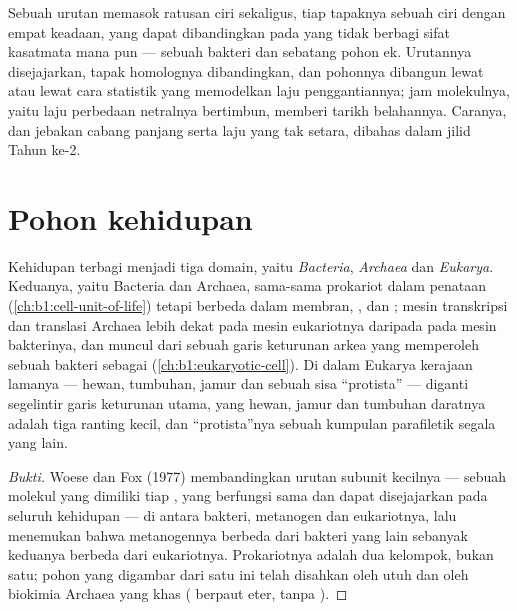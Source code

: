 \begin{remark}\label{rem:b1:classifying-biodiversity:molecular}
Sebuah urutan  memasok ratusan ciri sekaligus, tiap tapaknya
sebuah ciri dengan empat keadaan, yang dapat dibandingkan pada
 yang tidak berbagi sifat kasatmata mana pun --- sebuah
bakteri dan sebatang pohon ek. Urutannya disejajarkan, tapak
homolognya dibandingkan, dan pohonnya dibangun lewat  atau
lewat cara statistik yang memodelkan laju penggantiannya; jam
molekulnya, yaitu laju perbedaan netralnya bertimbun, memberi tarikh
belahannya. Caranya, dan jebakan cabang panjang serta laju yang tak
setara, dibahas dalam jilid Tahun ke-2.
\end{remark}

\section{Pohon kehidupan}

\begin{proposition}\label{prop:b1:classifying-biodiversity:domains}
Kehidupan terbagi menjadi tiga domain, yaitu \emph{Bacteria},
\emph{Archaea} dan \emph{Eukarya}. Keduanya, yaitu Bacteria dan
Archaea, sama-sama prokariot dalam penataan  (\cref{ch:b1:cell-unit-of-life}) tetapi berbeda dalam
 membran, ,  dan ; mesin
transkripsi dan translasi Archaea lebih dekat pada mesin eukariotnya
daripada pada mesin bakterinya, dan  muncul dari sebuah
garis keturunan arkea yang memperoleh sebuah bakteri sebagai
 (\cref{ch:b1:eukaryotic-cell}). Di dalam Eukarya
kerajaan lamanya --- hewan, tumbuhan, jamur dan sebuah sisa
``protista'' --- diganti segelintir garis keturunan utama, yang
hewan, jamur dan tumbuhan daratnya adalah tiga ranting kecil, dan
``protista''nya sebuah kumpulan parafiletik segala yang lain.
\end{proposition}
\begin{proof}[Bukti]
Woese dan Fox (1977) membandingkan urutan  subunit
kecilnya --- sebuah molekul yang dimiliki tiap , yang berfungsi
sama dan dapat disejajarkan pada seluruh kehidupan --- di antara
bakteri, metanogen dan eukariotnya, lalu menemukan bahwa metanogennya
berbeda dari bakteri yang lain sebanyak keduanya berbeda dari
eukariotnya. Prokariotnya adalah dua kelompok, bukan satu; pohon yang
digambar dari satu  ini telah disahkan oleh  utuh dan oleh
biokimia Archaea yang khas ( berpaut eter, tanpa ).
\end{proof}

